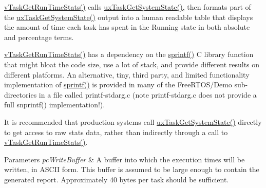 \hyperlink{task_8h_a52da9b427041a48dc9f6802e10f151d4}{v\+Task\+Get\+Run\+Time\+Stats()} calls \hyperlink{task_8h_a5bd92b080086390cae790e5bd74bd018}{ux\+Task\+Get\+System\+State()}, then formats part of the \hyperlink{task_8h_a5bd92b080086390cae790e5bd74bd018}{ux\+Task\+Get\+System\+State()} output into a human readable table that displays the amount of time each task has spent in the Running state in both absolute and percentage terms.

\hyperlink{task_8h_a52da9b427041a48dc9f6802e10f151d4}{v\+Task\+Get\+Run\+Time\+Stats()} has a dependency on the \hyperlink{derivative_8h_a5998f60c4f4af322b36debdbd11d7917}{sprintf()} C library function that might bloat the code size, use a lot of stack, and provide different results on different platforms. An alternative, tiny, third party, and limited functionality implementation of \hyperlink{derivative_8h_a5998f60c4f4af322b36debdbd11d7917}{sprintf()} is provided in many of the Free\+R\+T\+O\+S/\+Demo sub-\/directories in a file called printf-\/stdarg.\+c (note printf-\/stdarg.\+c does not provide a full snprintf() implementation!).

It is recommended that production systems call \hyperlink{task_8h_a5bd92b080086390cae790e5bd74bd018}{ux\+Task\+Get\+System\+State()} directly to get access to raw stats data, rather than indirectly through a call to \hyperlink{task_8h_a52da9b427041a48dc9f6802e10f151d4}{v\+Task\+Get\+Run\+Time\+Stats()}.


\begin{DoxyParams}{Parameters}
{\em pc\+Write\+Buffer} & A buffer into which the execution times will be written, in A\+S\+C\+II form. This buffer is assumed to be large enough to contain the generated report. Approximately 40 bytes per task should be sufficient. \\
\hline
\end{DoxyParams}
